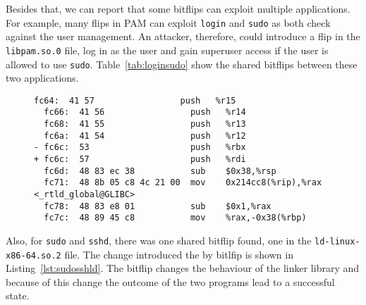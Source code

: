 Besides that, we can report that some bitflips can exploit multiple
applications. For example, many flips in PAM can exploit \texttt{login} and
\texttt{sudo} as both check against the user management. An attacker, therefore,
could introduce a flip in the \texttt{libpam.so.0} file, log in as the user and
gain superuser access if the user is allowed to use \texttt{sudo}.
Table~\ref{tab:loginsudo} show the shared bitflips between these two
applications.

\begin{figure}
\begin{minipage}{\linewidth}
\begin{lstlisting}[style=diff,
                   caption={Diff for the disassembly of the linker binary with
a bitflip exploiting the \texttt{sudo} and \texttt{ssh} program. The bitflip
changes the register pushed on the stack.},
label=lst:sudosshld]
  fc64:  41 57                 push   %r15
  fc66:  41 56                 push   %r14
  fc68:  41 55                 push   %r13
  fc6a:  41 54                 push   %r12
- fc6c:  53                    push   %rbx
+ fc6c:  57                    push   %rdi
  fc6d:  48 83 ec 38           sub    $0x38,%rsp
  fc71:  48 8b 05 c8 4c 21 00  mov    0x214cc8(%rip),%rax  <_rtld_global@GLIBC>
  fc78:  48 83 e8 01           sub    $0x1,%rax
  fc7c:  48 89 45 c8           mov    %rax,-0x38(%rbp)
\end{lstlisting}
\end{minipage}
\end{figure}

Also, for \texttt{sudo} and \texttt{sshd}, there was one shared bitflip found,
one in the \texttt{ld-linux-x86-64.so.2} file. The change introduced the by
bitlfip is shown in Listing~\ref{lst:sudosshld}. The bitflip changes the
behaviour of the linker library and because of this change the outcome of the
two programs lead to a successful state.

